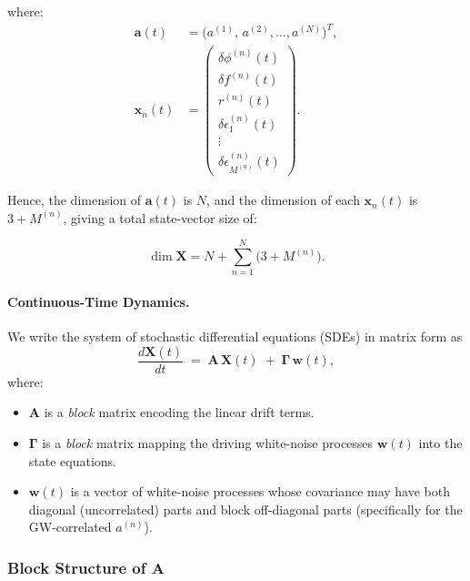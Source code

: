 \documentclass[]{scrartcl}
\begin{document}
where:
\begin{align}
\mathbf{a}(t) &= \bigl(a^{(1)},\,a^{(2)},\dots,a^{(N)}\bigr)^{T}, \\
\mathbf{x}_n(t) &=
\begin{pmatrix}
\delta\phi^{(n)}(t)\\
\delta f^{(n)}(t)\\
r^{(n)}(t)\\
\delta \epsilon_{1}^{(n)}(t)\\
\vdots\\
\delta \epsilon_{M^{(n)}}^{(n)}(t)
\end{pmatrix}.
\end{align}

Hence, the dimension of $\mathbf{a}(t)$ is $N$, and the dimension of each $\mathbf{x}_n(t)$ is $3 + M^{(n)}$, giving a total state-vector size of:

\begin{equation}
\dim\mathbf{X} = N + \sum_{n=1}^{N} \bigl(3 + M^{(n)}\bigr).
\end{equation}

\paragraph{Continuous-Time Dynamics.}
We write the system of stochastic differential equations (SDEs) in matrix form as
\begin{equation}
\label{eq:SDE:continuous}
\frac{d\mathbf{X}(t)}{dt}
\;=\;
\mathbf{A}\,\mathbf{X}(t)
\;+\;
\mathbf{\Gamma}\,\mathbf{w}(t),
\end{equation}
where:
\begin{itemize}
\item $\mathbf{A}$ is a \emph{block} matrix encoding the linear drift terms.
\item $\mathbf{\Gamma}$ is a \emph{block} matrix mapping the driving white-noise processes $\mathbf{w}(t)$ into the state equations.
\item $\mathbf{w}(t)$ is a vector of white-noise processes whose covariance may have both diagonal (uncorrelated) parts and block off-diagonal parts (specifically for the GW-correlated $a^{(n)}$).
\end{itemize}

\subsubsection*{Block Structure of $\mathbf{A}$}
\end{document}

